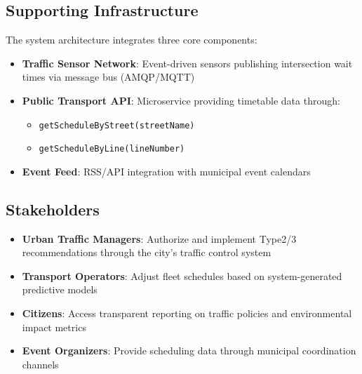 \documentclass[11.5pt]{article}
\begin{document}
    \subsection{Supporting Infrastructure}
    The system architecture integrates three core components:
    \begin{itemize}
        \item \textbf{Traffic Sensor Network}: Event-driven sensors publishing intersection wait times via message bus (AMQP/MQTT)
        \item \textbf{Public Transport API}: Microservice providing timetable data through:
        \begin{itemize}
            \item \texttt{getScheduleByStreet(streetName)}
            \item \texttt{getScheduleByLine(lineNumber)}
        \end{itemize}
        \item \textbf{Event Feed}: RSS/API integration with municipal event calendars
    \end{itemize}
    
    \subsection{Stakeholders}
    \begin{itemize}
        \item \textbf{Urban Traffic Managers}: Authorize and implement Type2/3 recommendations through the city's traffic control system
        \item \textbf{Transport Operators}: Adjust fleet schedules based on system-generated predictive models
        \item \textbf{Citizens}: Access transparent reporting on traffic policies and environmental impact metrics
        \item \textbf{Event Organizers}: Provide scheduling data through municipal coordination channels
    \end{itemize}
    
\end{document}
